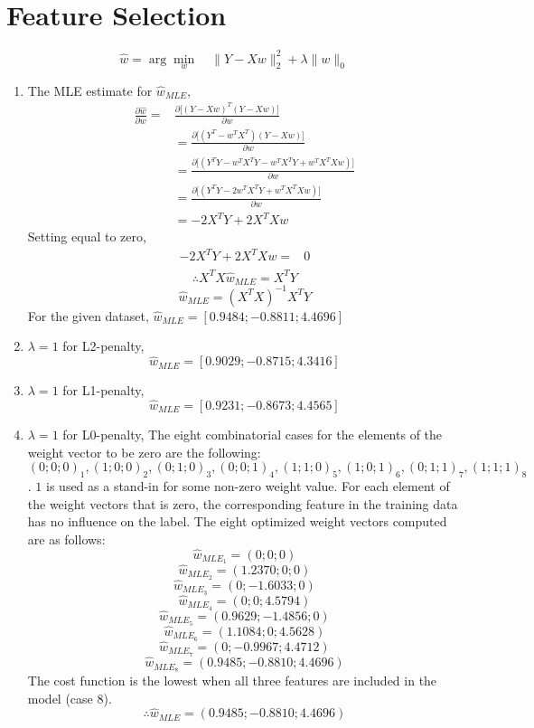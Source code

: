 \documentclass[english]{article}
\begin{document}
\section{Feature Selection}

$$\hat{w} = \arg \min_w  \quad \|Y - Xw\|_2^2 + \lambda \|w\|_0$$
\begin{enumerate}

\item The MLE estimate for $\hat{w}_{MLE}$,
\begin{align*}
\frac{\partial \hat{w}}{\partial w} {}={} & \frac{\partial \big[(Y - Xw)^T(Y - Xw)\big]}{\partial w} \\
& = \frac{\partial \big[(Y^T - w^TX^T)(Y - Xw)\big]}{\partial w} \\
& = \frac{\partial \big[(Y^TY - w^TX^TY - w^TX^TY + w^TX^TXw)\big]}{\partial w} \\
& = \frac{\partial \big[(Y^TY - 2w^TX^TY + w^TX^TXw)\big]}{\partial w} \\
& = -2X^TY + 2X^TXw
\end{align*}
Setting equal to zero,
\begin{align*}
-2X^TY + 2X^TXw {}={} & 0 \\
\end{align*}
$$\therefore X^TX\hat{w}_{MLE} = X^TY$$
$$\hat{w}_{MLE} = (X^TX)^{-1}X^TY$$
For the given dataset, $\hat{w}_{MLE} = [0.9484; -0.8811; 4.4696]$

\item $\lambda = 1$ for L2-penalty,
$$\hat{w}_{MLE} = [0.9029; -0.8715; 4.3416]$$

\item $\lambda = 1$ for L1-penalty,
$$\hat{w}_{MLE} = [0.9231; -0.8673; 4.4565]$$

\item $\lambda = 1$ for L0-penalty,
The eight combinatorial cases for the elements of the weight vector to be zero are the following: $(0; 0; 0)_1, (1; 0; 0)_2, (0; 1; 0)_3, (0; 0; 1)_4, (1; 1; 0)_5, (1; 0; 1)_6, (0; 1; 1)_7, (1; 1; 1)_8$. $1$ is used as a stand-in for some non-zero weight value.
For each element of the weight vectors that is zero, the corresponding feature in the training data has no influence on the label. The eight optimized weight vectors computed are as follows:
$$\hat{w}_{{MLE}_1} = (0; 0; 0)$$
$$\hat{w}_{{MLE}_2} = (1.2370; 0; 0)$$
$$\hat{w}_{{MLE}_3} = (0; -1.6033; 0)$$
$$\hat{w}_{{MLE}_4} = (0; 0; 4.5794)$$
$$\hat{w}_{{MLE}_5} = (0.9629; -1.4856; 0)$$
$$\hat{w}_{{MLE}_6} = (1.1084; 0; 4.5628)$$
$$\hat{w}_{{MLE}_7} = (0; -0.9967; 4.4712)$$
$$\hat{w}_{{MLE}_8} = (0.9485; -0.8810; 4.4696)$$
The cost function is the lowest when all three features are included in the model (case 8). 
$$\therefore \hat{w}_{{MLE}} = (0.9485; -0.8810; 4.4696)$$


\end{enumerate}
\end{document}

